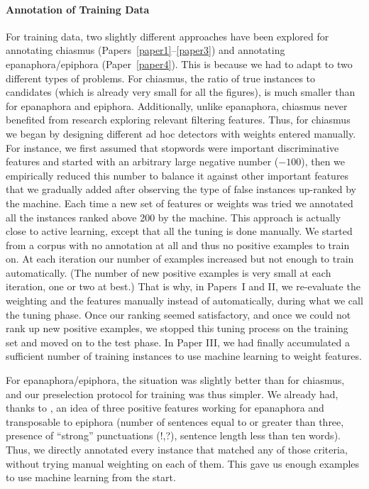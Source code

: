 \paragraph{Annotation of Training Data}
For training data, two slightly different approaches have been explored for annotating chiasmus (Papers~\ref{paper1}--\ref{paper3})  and annotating epanaphora/epiphora (Paper~\ref{paper4}). This is because we had to adapt to two different types of problems. For chiasmus, the ratio of true instances to candidates (which is already very small for all the figures), is much smaller than for epanaphora and epiphora. Additionally, unlike epanaphora, chiasmus never benefited from research exploring relevant filtering features. Thus, for chiasmus we began by designing different ad hoc detectors with weights entered manually. For instance, we first assumed that stopwords were important discriminative features and started with an arbitrary large negative number ($-100$), then we empirically reduced this number to balance it against other important features that we gradually added after observing the type of false instances up-ranked by the machine. Each time a new set of features or weights was tried we annotated all the instances ranked above 200 by the machine. This approach is actually close to active learning, %
 except that all the tuning is done manually. We started from a corpus with no annotation at all and thus no positive examples to train on. At each iteration our number of examples increased but not enough to train automatically. (The number of new positive examples is very small at each iteration, one or two at best.)  That is why, in Papers~I and II, we re-evaluate the weighting and the features manually instead of automatically, during what we call the tuning phase. Once our ranking seemed satisfactory, and once we could not rank up new positive examples, we stopped this tuning process on the training set and moved on to the test phase. In Paper III, we had finally accumulated a sufficient number of training instances to use machine learning to weight features.

For epanaphora/epiphora, the situation was slightly better than for chiasmus, and our preselection protocol for training was thus simpler. We already had, thanks to \cite{Strommer2011}, an idea of three positive features working for epanaphora and transposable to epiphora (number of sentences equal to or greater than three, presence of ``strong'' punctuations (!,?), sentence length less than ten words). Thus, we directly annotated every instance that matched any of those criteria, without trying manual weighting on each of them. This gave us enough examples to use machine learning from the start.
